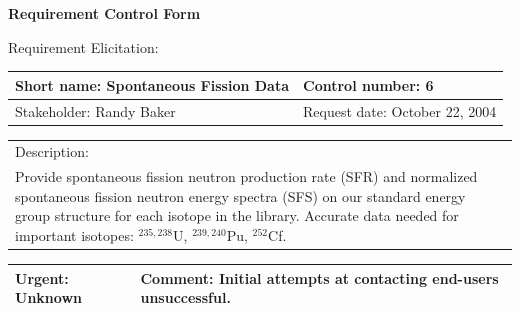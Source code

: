 \documentclass{article}
\begin{document}
\begin{center}\Large\bf
Requirement Control Form
\end{center}
\vspace{24pt}

Requirement Elicitation:

\begin{tabular}{|p{211pt}|p{211pt}|} \hline
Short name: Spontaneous Fission Data & Control number: 6\\ \hline
Stakeholder: Randy Baker & Request date: October 22, 2004\\
\end{tabular}
\begin{tabular}{|p{433pt}|} \hline
Description: \\ Provide spontaneous fission neutron production
rate (SFR) and normalized spontaneous fission neutron energy spectra
(SFS) on our standard energy group structure for each isotope in the
library.  Accurate data needed for important isotopes: $^{235,238}$U, $^{239,240}$Pu, $^{252}$Cf. \\
\hline
\end{tabular} 
\begin{tabular}{|p{211pt}|p{211pt}|} \hline
Urgent: Unknown & Comment: Initial attempts at contacting
end-users unsuccessful. \\ \hline
\end{tabular}

\vspace{12pt}
\end{document}
